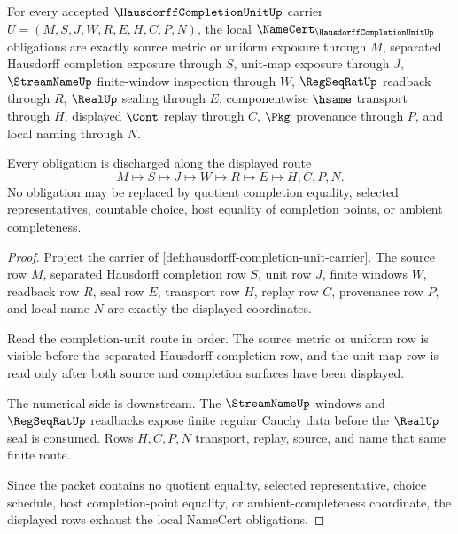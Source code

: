 \begin{theorem}
\label{thm:hausdorff-completion-unit-namecert-obligations}
For every accepted $\HausdorffCompletionUnitUp$ carrier $U=(M,S,J,W,R,E,H,C,P,N)$, the local $\NameCert_{\HausdorffCompletionUnitUp}$ obligations are exactly source metric or uniform exposure through $M$, separated Hausdorff completion exposure through $S$, unit-map exposure through $J$, $\StreamNameUp$ finite-window inspection through $W$, $\RegSeqRatUp$ readback through $R$, $\RealUp$ sealing through $E$, componentwise $\hsame$ transport through $H$, displayed $\Cont$ replay through $C$, $\Pkg$ provenance through $P$, and local naming through $N$.

Every obligation is discharged along the displayed route
$$
M\longmapsto S\longmapsto J\longmapsto W\longmapsto R\longmapsto E\longmapsto H,C,P,N .
$$
No obligation may be replaced by quotient completion equality, selected representatives, countable choice, host equality of completion points, or ambient completeness.
\end{theorem}
\begin{proof}
Project the carrier of \autoref{def:hausdorff-completion-unit-carrier}. The source row $M$, separated Hausdorff completion row $S$, unit row $J$, finite windows $W$, readback row $R$, seal row $E$, transport row $H$, replay row $C$, provenance row $P$, and local name $N$ are exactly the displayed coordinates.

Read the completion-unit route in order. The source metric or uniform row is visible before the separated Hausdorff completion row, and the unit-map row is read only after both source and completion surfaces have been displayed.

The numerical side is downstream. The $\StreamNameUp$ windows and $\RegSeqRatUp$ readbacks expose finite regular Cauchy data before the $\RealUp$ seal is consumed. Rows $H,C,P,N$ transport, replay, source, and name that same finite route.

Since the packet contains no quotient equality, selected representative, choice schedule, host completion-point equality, or ambient-completeness coordinate, the displayed rows exhaust the local NameCert obligations.
\end{proof}

